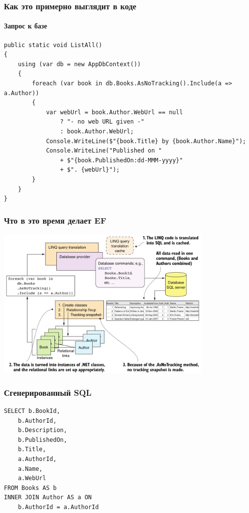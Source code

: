 \documentclass{../../slides-style}
\begin{document}
    \begin{frame}[fragile]
        \frametitle{Как это примерно выглядит в коде}
        \framesubtitle{Запрос к базе}
        \begin{footnotesize}
            \begin{verbatim}
public static void ListAll()
{
    using (var db = new AppDbContext())
    {
        foreach (var book in db.Books.AsNoTracking().Include(a => a.Author))
        {
            var webUrl = book.Author.WebUrl == null 
                ? "- no web URL given -" 
                : book.Author.WebUrl;
            Console.WriteLine($"{book.Title} by {book.Author.Name}");
            Console.WriteLine("Published on " 
                + $"{book.PublishedOn:dd-MMM-yyyy}" 
                + $". {webUrl}");
        }
    }
}
            \end{verbatim}
        \end{footnotesize}
    \end{frame}

    \begin{frame}
        \frametitle{Что в это время делает EF}
        \begin{center}
            \includegraphics[width=0.8\textwidth]{efCoreQuery.png}
        \end{center}
    \end{frame}

    \begin{frame}[fragile]
        \frametitle{Сгенерированный SQL}
        \begin{verbatim}
SELECT b.BookId,
    b.AuthorId,
    b.Description,
    b.PublishedOn,
    b.Title,
    a.AuthorId,
    a.Name,
    a.WebUrl
FROM Books AS b
INNER JOIN Author AS a ON
    b.AuthorId = a.AuthorId
        \end{verbatim}
    \end{frame}
\end{document}
